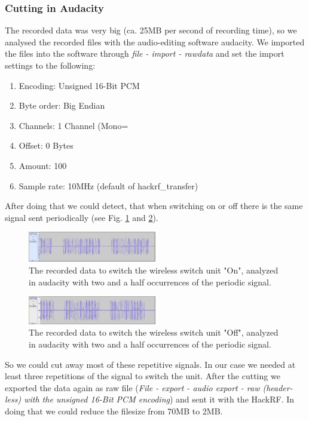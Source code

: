 \documentclass[conference]{IEEEtran}
\begin{document}
\subsubsection{Cutting in Audacity}
The recorded data was very big (ca. 25MB per second of recording time), so we analysed the recorded files with the audio-editing software audacity. We imported the files into the software through \textit{file - import - rawdata} and set the import settings to the following:

\begin{enumerate}
	\item Encoding: Unsigned 16-Bit PCM
	\item Byte order: Big Endian
	\item Channels: 1 Channel (Mono=
	\item Offset: 0 Bytes
	\item Amount: 100%
	\item Sample rate: 10MHz (default of hackrf\_transfer)
\end{enumerate}
\bigbreak
After doing that we could detect, that when switching on or off there is the same signal sent periodically (see Fig. \ref{fig:audacity_on} and \ref{fig:audacity_off}). 

\begin{figure}[H]
	\centering
	\includegraphics[width=0.5\textwidth]{audacity_received_on}
	\caption{The recorded data to switch the wireless switch unit "On", analyzed in audacity with two and a half occurrences of the periodic signal.}
	\label{fig:audacity_on}
\end{figure}

\begin{figure}[H]
	\centering
	\includegraphics[width=0.5\textwidth]{audacity_received_off}
	\caption{The recorded data to switch the wireless switch unit "Off", analyzed in audacity with two and a half occurrences of the periodic signal.}
	\label{fig:audacity_off}
\end{figure}

So we could cut away most of these repetitive signals. In our case we needed at least three repetitions of the signal to switch the unit. After the cutting we exported the data again as raw file (\textit{File - export - audio export - raw (header-less) with the unsigned 16-Bit PCM encoding}) and sent it with the HackRF. In doing that we could reduce the filesize from 70MB to 2MB.
\end{document}
